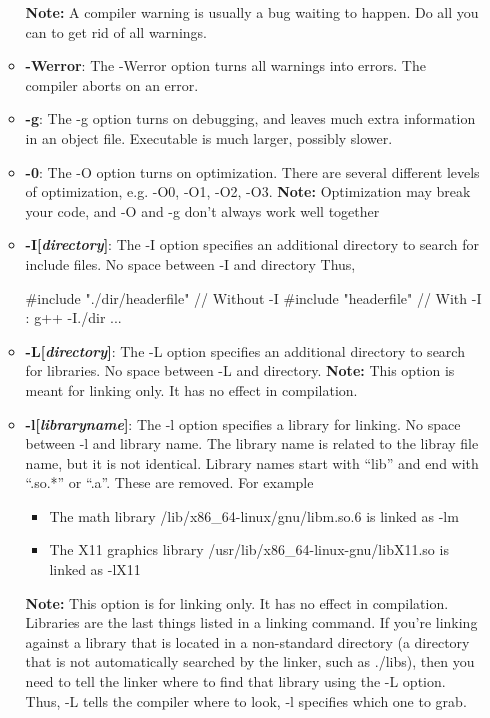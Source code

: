 \documentclass{report}
\begin{document}
\begin{itemize}
\begin{itemize}
                    \bigbreak \noindent 
                    \textbf{Note:} A compiler warning is usually a bug waiting to happen. Do all you can to get rid of all warnings.
                \item \textbf{-Werror}: The -Werror option turns all warnings into errors. The compiler aborts on an error.
                \item \textbf{-g}: The -g option turns on debugging, and leaves much extra information in an object file. Executable is much larger, possibly slower.
                \item \textbf{-0}: The -O option turns on optimization. There are several different levels of optimization, e.g. -O0, -O1, -O2, -O3. 
                    \bigbreak \noindent 
                    \textbf{Note:} Optimization may break your code, and -O and -g don’t always work well together
                \item \textbf{-I[\textit{directory}]}: The -I option specifies an additional directory to search for include files. No space between -I and directory
                    \bigbreak \noindent 
                    Thus, 
                    \begin{cppcode}
                    #include "./dir/headerfile" // Without -I
                    #include "headerfile" // With -I : g++ -I./dir ...
                    \end{cppcode}
                \item \textbf{-L[\textit{directory}]}: The -L option specifies an additional directory to search for libraries. No space between -L and directory.
                    \bigbreak \noindent 
                    \textbf{Note:} This option is meant for linking only. It has no effect in compilation.
                \item \textbf{-l[\textit{libraryname}]}: The -l option specifies a library for linking. No space between -l and library name. The library name is related to the libray file name, but it is not identical. Library names start with “lib” and end with “.so.*” or “.a”. These are removed. For example
                    \begin{itemize}
                        \item The math library /lib/x86_64-linux/gnu/libm.so.6 is linked as -lm
                        \item The X11 graphics library /usr/lib/x86_64-linux-gnu/libX11.so is linked as -lX11
                    \end{itemize}
                    \bigbreak \noindent 
                    \textbf{Note:} This option is for linking only. It has no effect in compilation.  Libraries are the last things listed in a linking command.
                    \bigbreak \noindent 
                    If you're linking against a library that is located in a non-standard directory (a directory that is not automatically searched by the linker, such as ./libs), then you need to tell the linker where to find that library using the -L option. Thus, -L tells the compiler  where to look, -l specifies which one to grab.


\end{itemize}
\end{itemize}
\end{document}

